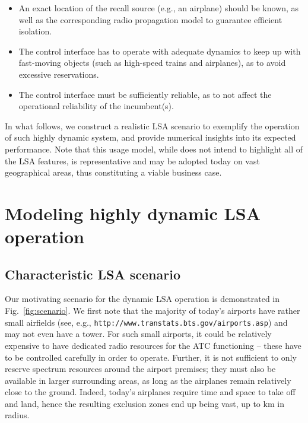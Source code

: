 \documentclass[journal]{IEEEtran}
\begin{document}
\begin{itemize}
	\item An exact location of the recall source (e.g., an airplane) should be known, as well as the corresponding radio propagation model to guarantee efficient isolation.
	\item The control interface has to operate with adequate dynamics to keep up with fast-moving objects (such as high-speed trains and airplanes), as to avoid excessive reservations.
	\item The control interface must be sufficiently reliable, as to not affect the operational reliability of the incumbent(s).
\end{itemize}

In what follows, we construct a realistic LSA scenario to exemplify the operation of such highly dynamic system, and provide numerical insights into its expected performance. Note that this usage model, while does not intend to highlight all of the LSA features, is representative and may be adopted today on vast geographical areas, thus constituting a viable business case.



\section{Modeling highly dynamic LSA operation}

\subsection{Characteristic LSA scenario}

Our motivating scenario for the dynamic LSA operation is demonstrated in Fig.~\ref{fig:scenario}. We first note that the majority of today's airports have rather small airfields (see, e.g., \verb+http://www.transtats.bts.gov/airports.asp+) and may not even have a tower. For such small airports, it could be relatively expensive to have dedicated radio resources for the ATC functioning -- these have to be controlled carefully in order to operate. Further, it is not sufficient to only reserve spectrum resources around the airport premises; they must also be available in larger surrounding areas, as long as the airplanes remain relatively close to the ground. Indeed, today's airplanes require time and space to take off and land, hence the resulting exclusion zones end up being vast, up to  km in radius.
\end{document}

